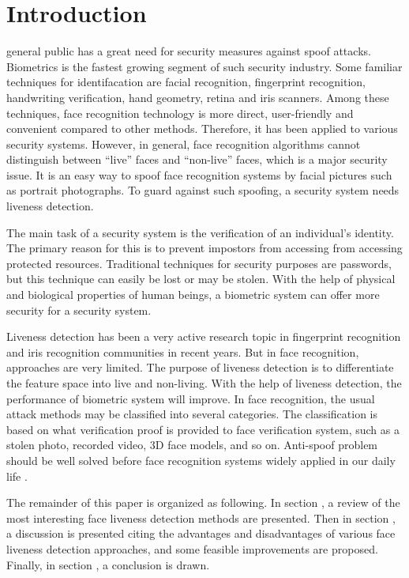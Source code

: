 \documentclass[journal]{IEEEtran}
\begin{document}
\section{Introduction}

  general public has a great need for security measures against spoof attacks. Biometrics is the fastest growing segment of such security industry. Some familiar techniques for identifacation are facial recognition, fingerprint recognition, handwriting verification, hand geometry, retina and iris scanners. Among these techniques, face recognition technology is more direct, user-friendly and convenient compared to other methods. Therefore, it has been applied to various security systems. However, in general, face recognition algorithms cannot distinguish between “live” faces and “non-live” faces, which is a major security issue. It is an easy way to spoof face recognition systems by facial pictures such as portrait photographs. To guard against such spoofing, a security system needs liveness detection.

The main task of a security system is the verification of an individual's identity. The primary reason for this is to prevent impostors from accessing from accessing protected resources. Traditional techniques for security purposes are passwords, but this technique can easily be lost or may be stolen. With the help of physical and biological properties of human beings, a biometric system can offer more security for a security system.

Liveness detection has been a very active research topic in fingerprint recognition and iris recognition communities in recent years. But in face recognition, approaches are very limited. The purpose of liveness detection is to differentiate the feature space into live and non-living. With the help of liveness detection, the performance of biometric system will improve. In face recognition, the usual attack methods may be classified into several categories. The classification is based on what verification proof is provided to face verification system, such as a stolen photo, recorded video, 3D face models, and so on. Anti-spoof problem should be well solved before face recognition systems widely applied in our daily life \cite{chakraborty2014overview}.

The remainder of this paper is organized as following. In section \uppercase\expandafter{}, a review of the most interesting face liveness detection methods are presented. Then in section \uppercase\expandafter{}, a discussion is presented citing the advantages and disadvantages of various face liveness detection approaches, and some feasible improvements are proposed. Finally, in section \uppercase\expandafter{}, a conclusion is drawn.
\end{document}
